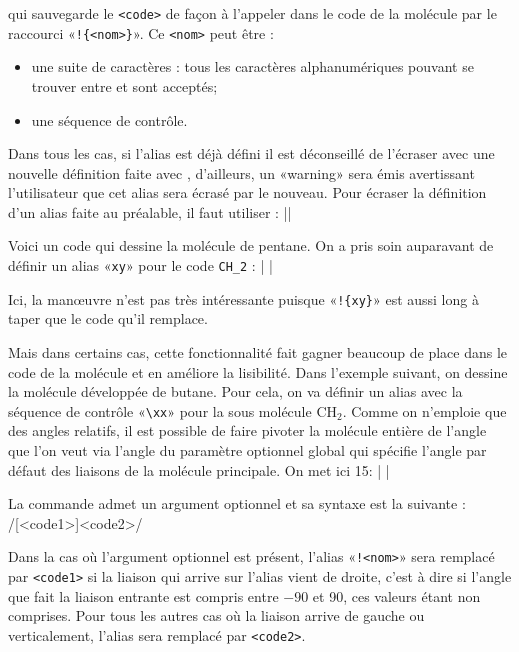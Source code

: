 \documentclass[10pt,french]{article}
\makeatletter
\newcommand\make@car@active[1]{%
	\catcode`#1\active
	\begingroup
		\lccode`\~`#1\relax
		\lowercase{\endgroup\def~}%
}
\newif\if@exstar
\newcommand\exemple{%
	\begingroup
	\parskip\z@
	\@makeother\;\@makeother\!\@makeother\?\@makeother\:%
	\@ifstar{\@exstartrue\exemple@}{\@exstarfalse\exemple@}}
\newcommand\exemple@[2][65]{%
	\medbreak\noindent
	\begingroup
		\let\do\@makeother\dospecials
		\make@car@active\ { {}}%
		\make@car@active\^^M{\par\leavevmode}%
		\make@car@active\^^I{\space\space}%
		\make@car@active\,{\leavevmode\kern\z@\string,}%
		\make@car@active\-{\leavevmode\kern\z@\string-}%
		\make@car@active\>{\leavevmode\kern\z@\string>}%
		\make@car@active\<{\leavevmode\kern\z@\string<}%
		\exemple@@{#1}{#2}%
}
\newcommand\exemple@@[3]{%
	\def\@tempa##1#3{\exemple@@@{#1}{#2}{##1}}%
	\@tempa
}
\newcommand\exemple@@@[3]{%
	\xdef\the@code{#3}%
	\endgroup
	\if@exstar
		\begingroup
			\fboxrule0.4pt
			\let\breakboxparindent\z@
			\def\bkvz@bottom{\hrule\@height\fboxrule}%
			\let\bkvz@before@breakbox\relax
			\def\bkvz@set@linewidth{\advance\linewidth\dimexpr-2\fboxrule-2\fboxsep}%
			\def\bkvz@left{\vrule\@width\fboxrule\hskip\fboxsep}%
			\def\bkvz@right{\hskip\fboxsep\vrule\@width\fboxrule}%
			\def\bkvz@top{\hbox to \hsize{%
				\vrule\@width\fboxrule\@height\fboxrule
				\leaders\bkvz@bottom\hfill
				\sffamily
				\fboxsep\z@
				\colorbox{black}{\kern0.25em\color{white}\footnotesize\lower0.5ex\hbox{\strut#2}\kern0.25em}%
				\leaders\bkvz@bottom\hfill
				\vrule\@width\fboxrule\@height\fboxrule}}%
			\breakbox
				\kern.5ex\relax
				\ttfamily\footnotesize\the@code\par
				\normalfont
				\kern3pt
				\hrule height0.1pt width\linewidth depth0.1pt
				\vskip5pt
				\rightskip0pt plus 1fill
				\everypar{{\color{lightgray}\rlap{\vrule height0.1pt width\linewidth depth0.1pt}}\hskip0pt plus 1fill}%
				\newlinechar`\^^M\everyeof{\noexpand}\scantokens{#3}\par
			\endbreakbox
		\endgroup
	\else
		\vskip0.5ex
		\boxput*(0,1)
			{\fboxsep\z@
			\hbox{\sffamily\colorbox{black}{\leavevmode\kern0.25em{\color{white}\footnotesize\strut#2}\kern0.25em}}%
			}%
			{\fboxsep5pt
			\fbox{%
				$\vcenter{\hsize\dimexpr0.#1\linewidth-\fboxsep-\fboxrule\relax
					\kern5pt\parskip0pt \ttfamily\footnotesize\the@code}%
				\vcenter{\kern5pt\hsize\dimexpr\linewidth-0.#1\linewidth-\fboxsep-\fboxrule\relax
					\everypar{{\color{lightgray}\rlap{\vrule height0.1pt width\dimexpr\linewidth-0.#1\linewidth-\fboxsep-\fboxrule depth0.1pt}}}%
					\footnotesize\newlinechar`\^^M\everyeof{\noexpand}\scantokens{#3}}$%
				}%
			}%
	\fi
	\medbreak
	\endgroup
}
\newcommand\falseverb[1]{{\ttfamily\detokenize\expandafter{\string#1}}}
\let\do\@makeother\dospecials
\makeatother
\begin{document}
qui sauvegarde le \verb/<code>/ de façon à l'appeler dans le code de la molécule par le raccourci «\verb/!{<nom>}/». Ce \verb-<nom>- peut être :
\begin{itemize}
	\item une suite de caractères : tous les caractères alphanumériques pouvant se trouver entre \texttt{\string\csname} et \texttt{\string\endcsname} sont acceptés;
	\item une séquence de contrôle.
\end{itemize}

Dans tous les cas, si l'alias est déjà défini il est déconseillé de l'écraser avec une nouvelle définition faite avec \falseverb{\definesubmol}, d'ailleurs, un «warning» sera émis avertissant l'utilisateur que cet alias sera écrasé par le nouveau. Pour écraser la définition d'un alias faite au préalable, il faut utiliser :\label{redefinesubmol}
\centerverb||
\smallskip

Voici un code qui dessine la molécule de pentane. On a pris soin auparavant de définir un alias «\verb/xy/» pour le code \verb/CH_2/ :
\exemple{Pentane}|
|

Ici, la manœuvre n'est pas très intéressante puisque «\verb/!{xy}/» est aussi long à taper que le code qu'il remplace.

Mais dans certains cas, cette fonctionnalité fait gagner beaucoup de place dans le code de la molécule et en améliore la lisibilité. Dans l'exemple suivant, on dessine la molécule développée de butane. Pour cela, on va définir un alias avec la séquence de contrôle «\verb/\xx/» pour la sous molécule $\mathrm{CH_2}$. Comme on n'emploie que des angles relatifs, il est possible de faire pivoter la molécule entière de l'angle que l'on veut via l'angle du paramètre optionnel global qui spécifie l'angle par défaut des liaisons de la molécule principale. On met ici 15\degres :
\exemple{Butane}|
|

La commande \falseverb{\definesubmol} admet un argument optionnel et sa syntaxe est la suivante :
\centerverb/[<code1>]{<code2>}/
\medskip

Dans la cas où l'argument optionnel est présent, l'alias «\verb-!<nom>-» sera remplacé par \verb'<code1>' si la liaison qui arrive sur l'alias vient de droite, c'est à dire si l'angle que fait la liaison entrante est compris entre $-90$\degres{} et 90\degres{}, ces valeurs étant non comprises. Pour tous les autres cas où la liaison arrive de gauche ou verticalement, l'alias sera remplacé par \verb-<code2>-.
\end{document}
